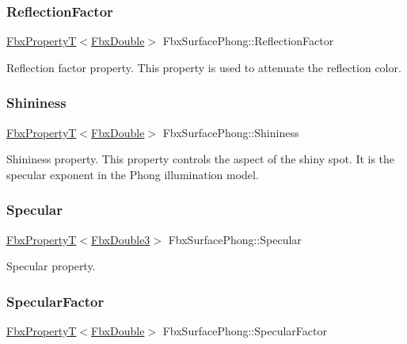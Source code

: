 \subsubsection{\texorpdfstring{Reflection\+Factor}{ReflectionFactor}}
{\footnotesize\ttfamily \hyperlink{class_fbx_property_t}{Fbx\+PropertyT}$<$\hyperlink{fbxtypes_8h_a171e72a1c46fc15c1a6c9c31948c1c5b}{Fbx\+Double}$>$ Fbx\+Surface\+Phong\+::\+Reflection\+Factor}

Reflection factor property. This property is used to attenuate the reflection color. \mbox{\label{class_fbx_surface_phong_ae92be9749116e7eedecb2447b6401d7d}} 
\subsubsection{\texorpdfstring{Shininess}{Shininess}}
{\footnotesize\ttfamily \hyperlink{class_fbx_property_t}{Fbx\+PropertyT}$<$\hyperlink{fbxtypes_8h_a171e72a1c46fc15c1a6c9c31948c1c5b}{Fbx\+Double}$>$ Fbx\+Surface\+Phong\+::\+Shininess}

Shininess property. This property controls the aspect of the shiny spot. It is the specular exponent in the Phong illumination model. \mbox{\label{class_fbx_surface_phong_a2f845bd60215d282c415e2129034e79e}} 
\subsubsection{\texorpdfstring{Specular}{Specular}}
{\footnotesize\ttfamily \hyperlink{class_fbx_property_t}{Fbx\+PropertyT}$<$\hyperlink{fbxtypes_8h_ae0a96f14cde566774c7553aa7523b7a7}{Fbx\+Double3}$>$ Fbx\+Surface\+Phong\+::\+Specular}



Specular property. 

\mbox{\label{class_fbx_surface_phong_a821efe9075d1d6ee22d3ab72ab303eaa}} 
\subsubsection{\texorpdfstring{Specular\+Factor}{SpecularFactor}}
{\footnotesize\ttfamily \hyperlink{class_fbx_property_t}{Fbx\+PropertyT}$<$\hyperlink{fbxtypes_8h_a171e72a1c46fc15c1a6c9c31948c1c5b}{Fbx\+Double}$>$ Fbx\+Surface\+Phong\+::\+Specular\+Factor}

